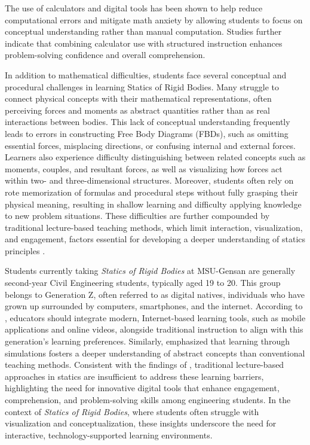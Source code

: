 The use of calculators and digital tools has been shown to help reduce computational errors and mitigate math anxiety by allowing students to focus on conceptual understanding rather than manual computation. \autocite{segarra_does_2024} Studies further indicate that combining calculator use with structured instruction enhances problem-solving confidence and overall comprehension.

In addition to mathematical difficulties, students face several conceptual and procedural challenges in learning Statics of Rigid Bodies. Many struggle to connect physical concepts with their mathematical representations, often perceiving forces and moments as abstract quantities rather than as real interactions between bodies. This lack of conceptual understanding frequently leads to errors in constructing Free Body Diagrams (FBDs), such as omitting essential forces, misplacing directions, or confusing internal and external forces. Learners also experience difficulty distinguishing between related concepts such as moments, couples, and resultant forces, as well as visualizing how forces act within two- and three-dimensional structures. Moreover, students often rely on rote memorization of formulas and procedural steps without fully grasping their physical meaning, resulting in shallow learning and difficulty applying knowledge to new problem situations. These difficulties are further compounded by traditional lecture-based teaching methods, which limit interaction, visualization, and engagement, factors essential for developing a deeper understanding of statics principles \autocite{salami_challenges_2025}. 

Students currently taking \textit{Statics of Rigid Bodies} at MSU-Gensan are generally second-year Civil Engineering students, typically aged 19 to 20. This group belongs to Generation Z, often referred to as digital natives, individuals who have grown up surrounded by computers, smartphones, and the internet. According to \cite{szymkowiak_information_2021}, educators should integrate modern, Internet-based learning tools, such as mobile applications and online videos, alongside traditional instruction to align with this generation's learning preferences. Similarly, \cite{zeichner_using_2020} emphasized that learning through simulations fosters a deeper understanding of abstract concepts than conventional teaching methods. Consistent with the findings of \cite{de_la_hoz_self-explanation_2023}, traditional lecture-based approaches in statics are insufficient to address these learning barriers, highlighting the need for innovative digital tools that enhance engagement, comprehension, and problem-solving skills among engineering students. In the context of \textit{Statics of Rigid Bodies}, where students often struggle with visualization and conceptualization, these insights underscore the need for interactive, technology-supported learning environments.

